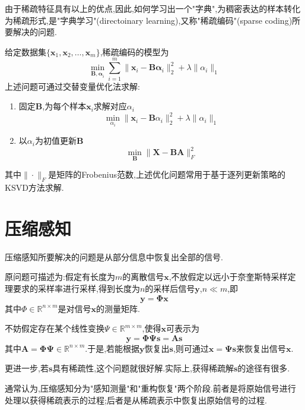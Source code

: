 由于稀疏特征具有以上的优点,因此,如何学习出一个"字典",为稠密表达的样本转化为稀疏形式,是"字典学习"(directoinary learning),又称"稀疏编码"(sparse coding)所要解决的问题.

给定数据集$\{\mathbf{x}_1,\mathbf{x}_2,\dots,\mathbf{x}_m\}$,稀疏编码的模型为
\begin{equation}
\min_{\mathbf{B,\alpha}_i}\sum_{i=1}^m\|\mathbf{x}_i-\mathbf{B\alpha}_i\|_2^2+\lambda\|\alpha_i\|_1
\end{equation}
上述问题可通过交替变量优化法求解:
\begin{enumerate}
\item 固定$\mathbf{B}$,为每个样本$\mathbf{x}_i$求解对应$\alpha_i$
    \begin{equation}
    \min_{\alpha_i}\|\mathbf{x}_i-\mathbf{B}\alpha_i\|_2^2+\lambda\|\alpha_i\|_1
    \end{equation}
\item 以$\alpha_i$为初值更新$\mathbf{B}$
    \begin{equation}
    \min_{\mathbf{B}}\|\mathbf{X-BA}\|_F^2
    \end{equation}
\end{enumerate}
其中$\|\cdot\|_F$是矩阵的Frobenius范数,上述优化问题常用于基于逐列更新策略的KSVD方法求解.

\section{压缩感知}

压缩感知所要解决的问题是从部分信息中恢复出全部的信号.

原问题可描述为:假定有长度为$m$的离散信号$\mathbf{x}$,不放假定以远小于奈奎斯特采样定理要求的采样率进行采样,得到长度为$n$的采样后信号$\mathbf{y}$,$n\ll m$,即
\begin{equation}
\mathbf{y=\Phi x}
\end{equation}
其中$\Phi\in \mathbb{R}^{n\times m}$是对信号$\mathbf{x}$的测量矩阵.

不妨假定存在某个线性变换$\Psi\in\mathbb{R}^{m\times m}$,使得$\mathbf{x}$可表示为
\begin{equation}
\mathbf{y=\Phi\Psi s=As}
\end{equation}
其中$\mathbf{A=\Phi\Psi}\in\mathbb{R}^{n\times m}$.于是,若能根据$\mathbf{y}$恢复出$\mathbf{s}$,则可通过$\mathbf{x=\Psi s}$来恢复出信号$\mathbf{x}$.

更进一步,若$\mathbf{s}$具有稀疏性,这个问题就很好解.实际上,获得稀疏解$\mathbf{s}$的途径有很多.

通常认为,压缩感知分为"感知测量"和"重构恢复"两个阶段.前者是将原始信号进行处理以获得稀疏表示的过程;后者是从稀疏表示中恢复出原始信号的过程.

